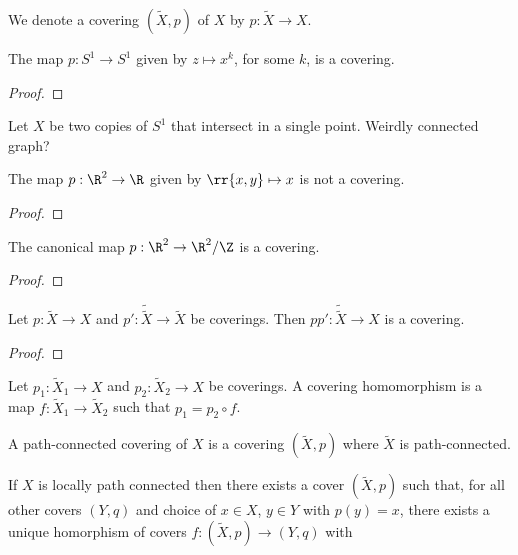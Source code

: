 \documentclass{article}
\begin{document}
\begin{notation}
  We denote a covering $(\tilde X,p)$ of $X$ by $p:\tilde X\to X$.
\end{notation}

\begin{example}
  The map $p:S^1\to S^1$ given by $z\mapsto x^k$, for some $k$, is a covering.
  \begin{proof}
    \missingproof
  \end{proof}
\end{example}

\begin{example}
  Let $X$ be two copies of $S^1$ that intersect in a single point. Weirdly connected
  graph?
\end{example}

\begin{example}
  The map $p:\R^2\to\R$ given by $\rr{x,y}\mapsto x$ is not a covering.
  \begin{proof}
    \missingproof
  \end{proof}
\end{example}

\begin{example}
  The canonical map $p:\R^2\to\R^2/\Z$ is a covering.
  \begin{proof}
    \missingproof
  \end{proof}
\end{example}

\begin{proposition}
  Let $p:\tilde X\to X$ and $p':\tilde{\tilde X}\to\tilde X$ be coverings.
  Then $pp':\tilde{\tilde{X}}\to X$ is a covering.
  \begin{proof}
    \missingproof
  \end{proof}
\end{proposition}

\begin{definition}
  Let $p_1:\tilde X_1\to X$ and $p_2:\tilde X_2\to X$ be coverings. A covering homomorphism
  is a map $f:\tilde X_1\to\tilde X_2$ such that $p_1 = p_2\circ f$.
\end{definition}

\begin{definition}
  A path-connected covering of $X$ is a covering $(\tilde X,p)$ where $\tilde X$ is
  path-connected.
\end{definition}

\begin{theorem}
  If $X$ is locally path connected then there exists a cover
  $(\tilde X,p)$ such that, for all other covers $(Y,q)$ and choice of $x\in X$, $y\in Y$
  with $p(y)=x$, there exists a unique homorphism of covers $f:(\tilde X,p)\to(Y,q)$
  with \missingdef
\end{theorem}
\end{document}
